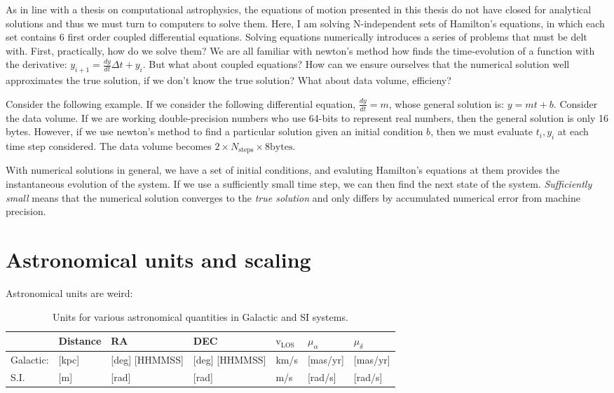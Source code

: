 As in line with a thesis on computational astrophysics, the equations of motion presented in this thesis do not have closed for analytical solutions and thus we must turn to computers to solve them. Here, I am solving N-independent sets of Hamilton's equations, in which each set contains 6 first order coupled differential equations. Solving equations numerically introduces a series of problems that must be delt with. First, practically, how do we solve them? We are all familiar with newton's method how finds the time-evolution of a function with the derivative: $y_{i+1} = \frac{dy}{dt}\Delta t + y_i$. But what about coupled equations? How can we ensure ourselves that the numerical solution well approximates the true solution, if we don't know the true solution? What about data volume, efficieny? 

Consider the following example. If we consider the following differential equation, $\frac{dy}{dt}=m$, whose general solution is: $y=mt+b$. Consider the data volume. If we are working double-precision numbers who use 64-bits to represent real numbers, then the general solution is only 16 bytes. However, if we use newton's method to find a particular solution given an initial condition $b$, then we must evaluate $t_i,y_i$ at each time step considered. The data volume becomes $2\times N_\mathrm{steps}\times 8 \mathrm{bytes}$. 

With numerical solutions in general, we have a set of initial conditions, and evaluting Hamilton's equations at them provides the instantaneous evolution of the system. If we use a sufficiently small time step, we can then find the next state of the system. \textit{Sufficiently small} means that the numerical solution converges to the \textit{true solution} and only differs by accumulated numerical error from machine precision. 


\section{Astronomical units and scaling}

    Astronomical units are weird: 

    \begin{table}[]
        \caption{Units for various astronomical quantities in Galactic and SI systems.}
        \label{tab:units}
        \begin{tabular}{l|l|l|l|l|l|l|}
                            & Distance  & RA                     & DEC                    & \textbf{$\mathrm{v}_\mathrm{LOS}$} & $\mu_\alpha$ & $\mu_\delta$ \\ \hline
            Galactic: & {[}kpc{]} & {[}deg{]} {[}HHMMSS{]} & {[}deg{]} {[}HHMMSS{]} & km/s                      & {[}mas/yr{]} & {[}mas/yr{]} \\ \hline
            S.I.       & {[}m{]}   & {[}rad{]}              & {[}rad{]}              & m/s                       & {[}rad/s{]}  & {[}rad/s{]}  \\ 
        \end{tabular}
    \end{table}


